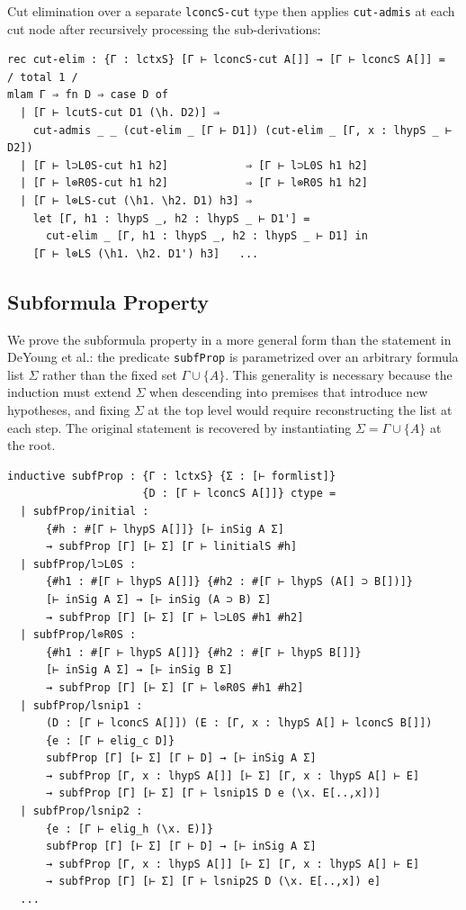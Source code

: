 Cut elimination over a separate \texttt{lconcS-cut} type then applies
\texttt{cut-admis} at each cut node after recursively processing the
sub-derivations:

\begin{lstlisting}
rec cut-elim : {Γ : lctxS} [Γ ⊢ lconcS-cut A[]] → [Γ ⊢ lconcS A[]] =
/ total 1 /
mlam Γ ⇒ fn D ⇒ case D of
  | [Γ ⊢ lcutS-cut D1 (\h. D2)] ⇒
    cut-admis _ _ (cut-elim _ [Γ ⊢ D1]) (cut-elim _ [Γ, x : lhypS _ ⊢ D2])
  | [Γ ⊢ l⊃L0S-cut h1 h2]            ⇒ [Γ ⊢ l⊃L0S h1 h2]
  | [Γ ⊢ l⊗R0S-cut h1 h2]            ⇒ [Γ ⊢ l⊗R0S h1 h2]
  | [Γ ⊢ l⊗LS-cut (\h1. \h2. D1) h3] ⇒
    let [Γ, h1 : lhypS _, h2 : lhypS _ ⊢ D1'] =
      cut-elim _ [Γ, h1 : lhypS _, h2 : lhypS _ ⊢ D1] in
    [Γ ⊢ l⊗LS (\h1. \h2. D1') h3]   ...
\end{lstlisting}

\subsection{Subformula Property}

We prove the subformula property in a more general form than the
statement in DeYoung et al.: the predicate \texttt{subfProp} is
parametrized over an arbitrary formula list $\Sigma$ rather than the
fixed set $\Gamma \cup \{A\}$. This generality is necessary because the
induction must extend $\Sigma$ when descending into premises that
introduce new hypotheses, and fixing $\Sigma$ at the top level would
require reconstructing the list at each step. The original statement is
recovered by instantiating $\Sigma = \Gamma \cup \{A\}$ at the root.

\begin{lstlisting}
inductive subfProp : {Γ : lctxS} {Σ : [⊢ formlist]}
                     {D : [Γ ⊢ lconcS A[]]} ctype =
  | subfProp/initial :
      {#h : #[Γ ⊢ lhypS A[]]} [⊢ inSig A Σ]
      → subfProp [Γ] [⊢ Σ] [Γ ⊢ linitialS #h]
  | subfProp/l⊃L0S :
      {#h1 : #[Γ ⊢ lhypS A[]]} {#h2 : #[Γ ⊢ lhypS (A[] ⊃ B[])]}
      [⊢ inSig A Σ] → [⊢ inSig (A ⊃ B) Σ]
      → subfProp [Γ] [⊢ Σ] [Γ ⊢ l⊃L0S #h1 #h2]
  | subfProp/l⊗R0S :
      {#h1 : #[Γ ⊢ lhypS A[]]} {#h2 : #[Γ ⊢ lhypS B[]]}
      [⊢ inSig A Σ] → [⊢ inSig B Σ]
      → subfProp [Γ] [⊢ Σ] [Γ ⊢ l⊗R0S #h1 #h2]
  | subfProp/lsnip1 :
      (D : [Γ ⊢ lconcS A[]]) (E : [Γ, x : lhypS A[] ⊢ lconcS B[]])
      {e : [Γ ⊢ elig_c D]}
      subfProp [Γ] [⊢ Σ] [Γ ⊢ D] → [⊢ inSig A Σ]
      → subfProp [Γ, x : lhypS A[]] [⊢ Σ] [Γ, x : lhypS A[] ⊢ E]
      → subfProp [Γ] [⊢ Σ] [Γ ⊢ lsnip1S D e (\x. E[..,x])]
  | subfProp/lsnip2 :
      {e : [Γ ⊢ elig_h (\x. E)]}
      subfProp [Γ] [⊢ Σ] [Γ ⊢ D] → [⊢ inSig A Σ]
      → subfProp [Γ, x : lhypS A[]] [⊢ Σ] [Γ, x : lhypS A[] ⊢ E]
      → subfProp [Γ] [⊢ Σ] [Γ ⊢ lsnip2S D (\x. E[..,x]) e]
  ...
\end{lstlisting}

